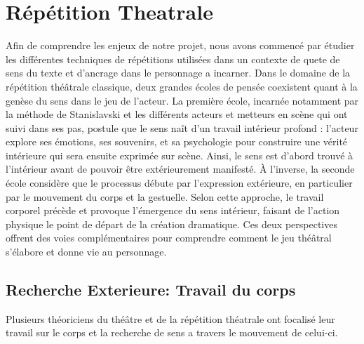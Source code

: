 \section{Répétition Theatrale}

Afin de comprendre les enjeux de notre projet, nous avons commencé par étudier les différentes techniques de répétitions utilisées 
dans un contexte de quete de sens du texte et d'ancrage dans le personnage a incarner. 
Dans le domaine de la répétition théâtrale classique, deux grandes écoles de pensée coexistent quant à la genèse du sens dans le 
jeu de l’acteur. La première école, incarnée notamment par la méthode de Stanislavski et les différents acteurs et metteurs en scène qui ont suivi dans
ses pas,
postule que le sens naît d’un travail intérieur profond : l’acteur explore ses émotions, ses souvenirs, et sa psychologie pour 
construire une vérité intérieure qui sera ensuite exprimée sur scène. Ainsi, le sens est 
d’abord trouvé à l’intérieur avant de pouvoir être extérieurement manifesté. À l’inverse, la seconde école considère que le processus 
débute par l’expression extérieure, en particulier par le mouvement du corps et la gestuelle.
Selon cette approche, le travail corporel précède et provoque l’émergence du sens intérieur, faisant de l’action physique le 
point de départ de la création dramatique. Ces deux perspectives offrent des voies complémentaires
pour comprendre comment le jeu théâtral s’élabore et donne vie au personnage.


\subsection{Recherche Exterieure: Travail du corps}
Plusieurs théoriciens du théâtre et de la répétition théatrale ont focalisé leur travail sur le corps et la recherche de sens a travers le
mouvement de celui-ci.

